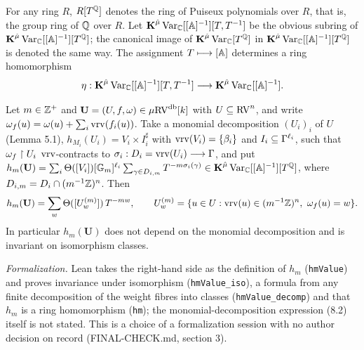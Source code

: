 \setcounter{theorem}{0}
\begin{definition}
\label{loc-rings}
\leanok
{}
For any ring $R$, $R[T^{\mathbb{Q}}]$ denotes the ring of Puiseux polynomials over $R$, that is, the group ring of $\mathbb{Q}$ over $R$. Let $\operatorname{\mathbf{K}}^{\hat\mu}\mathrm{Var}_{\mathbb{C}}[[\mathbb{A}]^{-1}][T,T^{-1}]$ be the obvious subring of $\operatorname{\mathbf{K}}^{\hat\mu}\mathrm{Var}_{\mathbb{C}}[[\mathbb{A}]^{-1}][T^{\mathbb{Q}}]$; the canonical image of $\operatorname{\mathbf{K}}^{\hat\mu}\mathrm{Var}_{\mathbb{C}}[T^{\mathbb{Q}}]$ in $\operatorname{\mathbf{K}}^{\hat\mu}\mathrm{Var}_{\mathbb{C}}[[\mathbb{A}]^{-1}][T^{\mathbb{Q}}]$ is denoted the same way. The assignment $T \longmapsto [\mathbb{A}]$ determines a ring homomorphism \[ \eta : \operatorname{\mathbf{K}}^{\hat\mu}\mathrm{Var}_{\mathbb{C}}[[\mathbb{A}]^{-1}][T,T^{-1}] \longrightarrow \operatorname{\mathbf{K}}^{\hat\mu}\mathrm{Var}_{\mathbb{C}}[[\mathbb{A}]^{-1}]. \]
\end{definition}

\setcounter{theorem}{1}
\begin{lemma}
\label{muhat-section}
\leanok
{}
Let $m \in \mathbb{Z}^+$ and $\mathbf U = (U, f, \omega) \in \mu\mathrm{RV}^{\operatorname{db}}[k]$ with $U \subseteq \mathrm{RV}^n$, and write $\omega_f(u) = \omega(u) + \sum_i \operatorname{vrv}(f_i(u))$. Take a monomial decomposition $(U_i)_i$ of $U$ (Lemma 5.1), $h_{M_i}(U_i) = V_i \times I_i^\sharp$ with $\operatorname{vrv}(V_i) = \{\beta_i\}$ and $I_i \subseteq \Gamma^{\ell_i}$, such that $\omega_f \upharpoonright U_i$ $\operatorname{vrv}$-contracts to $\sigma_i : D_i = \operatorname{vrv}(U_i) \longrightarrow \Gamma$, and put $h_m(\mathbf U) = \sum_i \Theta([V_i])[\mathbb{G}_m]^{\ell_i} \sum_{\gamma \in D_{i,m}} T^{-m\sigma_i(\gamma)} \in \operatorname{\mathbf{K}}^{\hat\mu}\mathrm{Var}_{\mathbb{C}}[[\mathbb{A}]^{-1}][T^{\mathbb{Q}}]$, where $D_{i,m} = D_i \cap (m^{-1}\mathbb{Z})^n$. Then \[ h_m(\mathbf U) = \sum_w \Theta([U^{(m)}_w])\, T^{-mw}, \qquad U^{(m)}_w = \{u \in U : \vrv(u) \in (m^{-1}\Z)^n,\ \omega_f(u) = w\}. \] In particular $h_m(\mathbf U)$ does not depend on the monomial decomposition and is invariant on isomorphism classes.

\emph{Formalization.} Lean takes the right-hand side as the definition of $h_m$ (\texttt{hmValue}) and proves invariance under isomorphism (\texttt{hmValue\_iso}), a formula from any finite decomposition of the weight fibres into classes (\texttt{hmValue\_decomp}) and that $h_m$ is a ring homomorphism (\texttt{hm}); the monomial-decomposition expression (8.2) itself is not stated. This is a choice of a formalization session with no author decision on record (FINAL-CHECK.md, section 3).
\end{lemma}

